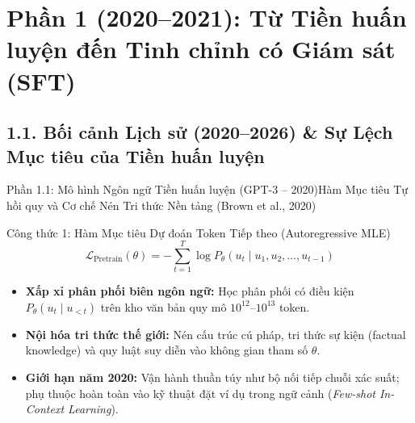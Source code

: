\section{Phần 1 (2020--2021): Từ Tiền huấn luyện đến Tinh chỉnh có Giám sát (SFT)}

\subsection{1.1. Bối cảnh Lịch sử (2020--2026) \& Sự Lệch Mục tiêu của Tiền huấn luyện}

\begin{frame}{Phần 1.1: Mô hình Ngôn ngữ Tiền huấn luyện (GPT-3 -- 2020)}{Hàm Mục tiêu Tự hồi quy và Cơ chế Nén Tri thức Nền tảng (Brown et al., 2020)}
  \begin{block}{Công thức 1: Hàm Mục tiêu Dự đoán Token Tiếp theo (Autoregressive MLE)}
    \[
      \mathcal{L}_{\text{Pretrain}}(\theta) = -\sum_{t=1}^{T} \log P_\theta(u_t \mid u_1, u_2, \dots, u_{t-1})
    \]
  \end{block}

  \small
  \begin{itemize}\setlength{\itemsep}{7pt}
    \item \textbf{Xấp xỉ phân phối biên ngôn ngữ:} Học phân phối có điều kiện $P_\theta(u_t \mid u_{<t})$ trên kho văn bản quy mô $10^{12}\text{--}10^{13}$ token.
    \item \textbf{Nội hóa tri thức thế giới:} Nén cấu trúc cú pháp, tri thức sự kiện (factual knowledge) và quy luật suy diễn vào không gian tham số $\theta$.
    \item \textbf{Giới hạn năm 2020:} Vận hành thuần túy như bộ nối tiếp chuỗi xác suất; phụ thuộc hoàn toàn vào kỹ thuật đặt ví dụ trong ngữ cảnh (\textit{Few-shot In-Context Learning}).
  \end{itemize}
\end{frame}

